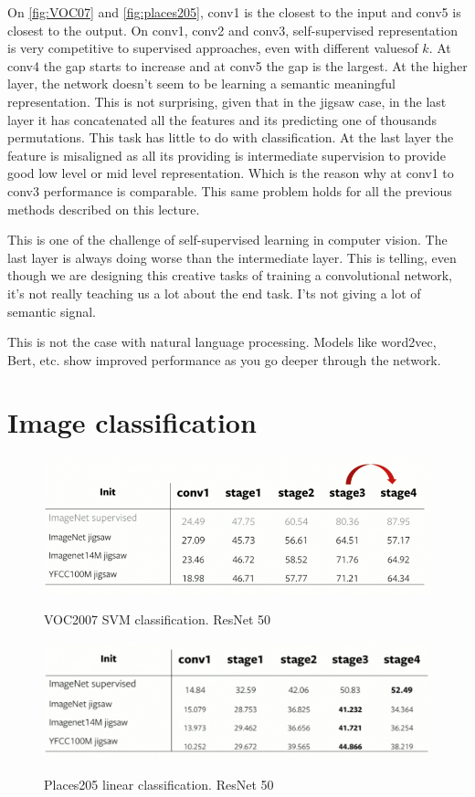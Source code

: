 On \ref{fig:VOC07} and \ref{fig:places205}, conv1 is the closest to the input and conv5 is closest to the output. On conv1, conv2 and conv3, self-supervised representation is very competitive to supervised approaches, even with different valuesof $k$. At conv4 the gap starts to increase and at conv5 the gap is the largest. At the higher layer, the network doesn't seem to be learning a semantic meaningful representation. This is not surprising, given that in the jigsaw case, in the last layer it has concatenated all the features and its predicting one of thousands permutations. This task has little to do with classification. At the last layer the feature is misaligned as all its providing is intermediate supervision to provide good low level or mid level representation. Which is the reason why at conv1 to conv3 performance is comparable. This same problem holds for all the previous methods described on this lecture.

This is one of the challenge of self-supervised learning in computer vision. The last layer is always doing worse than the intermediate layer. This is telling, even though we are designing this creative tasks of training a convolutional network, it’s not really teaching us a lot about the end task. I’ts not giving a lot of semantic signal.

This is not the case with natural language processing. Models like word2vec, Bert, etc. show improved performance as you go deeper through the network.

\section{Image classification}

\begin{figure}[H]
\centering
\includegraphics[width=0.8\linewidth]{figs/VOC2007_SVM_classification.png}
\label{fig:VOC2007_SVM_classification}
\caption{VOC2007 SVM classification. ResNet 50}
\end{figure}

\begin{figure}[H]
\centering
\includegraphics[width=0.8\linewidth]{figs/Places205_linear_classification.png}
\label{fig:Places205_linear_classification}
\caption{Places205 linear classification. ResNet 50}
\end{figure}

